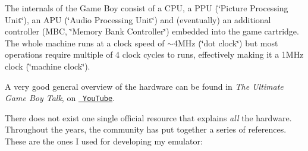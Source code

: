 The internals of the Game Boy consist of a CPU, a PPU (\char`\"{}\+Picture Processing Unit\char`\"{}), an APU (\char`\"{}\+Audio Processing Unit\char`\"{}) and (eventually) an additional controller (MBC, \char`\"{}\+Memory Bank Controller\char`\"{}) embedded into the game cartridge. The whole machine runs at a clock speed of $\sim$4\+MHz (\char`\"{}dot clock\char`\"{}) but most operations require multiple of 4 clock cycles to runs, effectively making it a 1MHz clock (\char`\"{}machine clock\char`\"{}).

A very good general overview of the hardware can be found in {\itshape The Ultimate Game Boy Talk}, on \href{https://www.youtube.com/watch?v=HyzD8pNlpwI}{\texttt{ You\+Tube}}.

There does not exist one single official resource that explains {\itshape all} the hardware. Throughout the years, the community has put together a series of references. These are the ones I used for developing my emulator\+:

